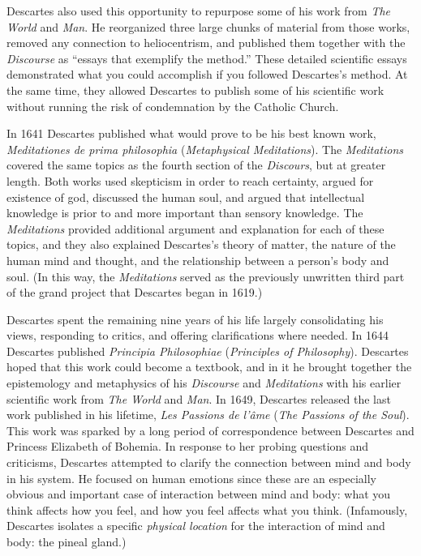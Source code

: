 Descartes also used this opportunity to repurpose some of his work from \textit{The World} and \textit{Man}. He reorganized three large chunks of material from those works, removed any connection to heliocentrism, and published them together with the \textit{Discourse} as ``essays that exemplify the method.'' These detailed scientific essays demonstrated what you could accomplish if you followed Descartes's method. At the same time, they allowed Descartes to publish some of his scientific work without running the risk of condemnation by the Catholic Church.

In 1641 Descartes published what would prove to be his best known work, \textit{Meditationes de prima philosophia} (\textit{Metaphysical Meditations}). The \textit{Meditations} covered the same topics as the fourth section of the \textit{Discours}, but at greater length. Both works used skepticism in order to reach certainty, argued for existence of god, discussed the human soul, and argued that intellectual knowledge is prior to and more important than sensory knowledge. The \textit{Meditations} provided additional argument and explanation for each of these topics, and they also explained Descartes's theory of matter, the nature of the human mind and thought, and the relationship between a person's body and soul. (In this way, the \textit{Meditations} served as the previously unwritten third part of the grand project that Descartes began in 1619.)

Descartes spent the remaining nine years of his life largely consolidating his views, responding to critics, and offering clarifications where needed. In 1644 Descartes published \textit{Principia Philosophiae} (\textit{Principles of Philosophy}). Descartes hoped that this work could become a textbook, and in it he brought together the epistemology and metaphysics of his \textit{Discourse} and \textit{Meditations} with his earlier scientific work from \textit{The World} and \textit{Man}. In 1649, Descartes released the last work published in his lifetime, \textit{Les Passions de l'âme} (\textit{The Passions of the Soul}). This work was sparked by a long period of correspondence between Descartes and Princess Elizabeth of Bohemia. In response to her probing questions and criticisms, Descartes attempted to clarify the connection between mind and body in his system. He focused on human emotions since these are an especially obvious and important case of interaction between mind and body: what you think affects how you feel, and how you feel affects what you think. (Infamously, Descartes isolates a specific \textit{physical location} for the interaction of mind and body: the pineal gland.)

